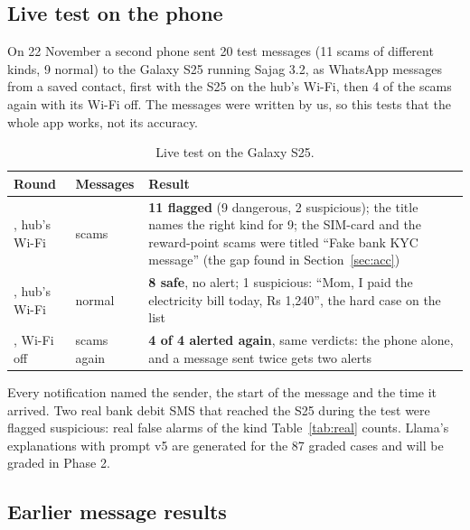 \documentclass[11pt,a4paper]{article}
\begin{document}
\subsection{Live test on the phone}
\label{sec:live}

On 22 November a second phone sent 20 test messages (11 scams of different kinds, 9 normal) to the Galaxy S25 running
Sajag 3.2, as WhatsApp messages from a saved contact, first with the S25 on the hub's Wi-Fi, then 4 of the scams again
with its Wi-Fi off. The messages were written by us, so this tests that the whole app works, not its accuracy.

\begin{table}[H]
\centering\small
\begin{tabularx}{\textwidth}{@{}>{\raggedright\arraybackslash}p{3.0cm}>{\raggedright\arraybackslash}p{2.6cm}X@{}}
\toprule
\textbf{Round} & \textbf{Messages} & \textbf{Result}\\
\midrule
1, hub's Wi-Fi & 11 scams & \textbf{11 flagged} (9 dangerous, 2 suspicious); the title names the right kind for 9; the SIM-card and the reward-point scams were titled ``Fake bank KYC message'' (the gap found in Section~\ref{sec:acc})\\
1, hub's Wi-Fi & 9 normal & \textbf{8 safe}, no alert; 1 suspicious: ``Mom, I paid the electricity bill today, Rs 1,240'', the hard case on the list\\
2, Wi-Fi off & 4 scams again & \textbf{4 of 4 alerted again}, same verdicts: the phone alone, and a message sent twice gets two alerts\\
\bottomrule
\end{tabularx}
\caption{Live test on the Galaxy S25.}
\label{tab:live}
\end{table}

Every notification named the sender, the start of the message and the time it arrived. Two real bank debit SMS that
reached the S25 during the test were flagged suspicious: real false alarms of the kind Table~\ref{tab:real} counts.
Llama's explanations with prompt v5 are generated for the 87 graded cases and will be graded in Phase 2.

\subsection{Earlier message results}
\end{document}
